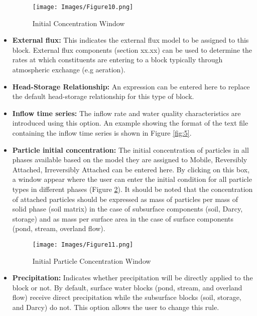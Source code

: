 \begin{itemize}
\begin{figure}[!ht]\label{fig:10}
\begin{center}
\texttt{[image: Images/Figure10.png]} \\
\caption{Initial Concentration Window} 
\end{center}
\end{figure}
\item \textbf{External flux: } This indicates the external flux model to be assigned to this block. External flux components (section xx.xx) can be used to determine the rates at which constituents are entering to a block typically through atmospheric exchange (e.g aeration). 
\item \textbf{Head-Storage Relationship: } An expression can be entered here to replace the default head-storage relationship for this type of block. 
\item \textbf{Inflow time series: } The inflow rate and water quality characteristics are introduced using this option. An example showing the format of the text file containing the inflow time series is shown in Figure \ref{fig:5}. 
\item \textbf{Particle initial concentration: } The initial concentration of particles in all phases available based on the model they are assigned to {Mobile, Reversibly Attached, Irreversibly Attached} can be entered here. By clicking on this box, a window appear where the user can enter the initial condition for all particle types in different phases (Figure \ref{fig:11}). It should be noted that the concentration of attached particles should be expressed as mass of particles per mass of solid phase (soil matrix) in the case of subsurface components (soil, Darcy, storage) and as mass per surface area in the case of surface components (pond, stream, overland flow). 
\begin{figure}[!ht]\label{fig:11}
\begin{center}
\texttt{[image: Images/Figure11.png]} \\
\caption{Initial Particle Concentration Window} 
\end{center}
\end{figure}
\item \textbf{Precipitation: } Indicates whether precipitation will be directly applied to the block or not. By default, surface water blocks (pond, stream, and overland flow) receive direct precipitation while the subsurface blocks (soil, storage, and Darcy) do not. This option allows the user to change this rule. 

\end{itemize}
